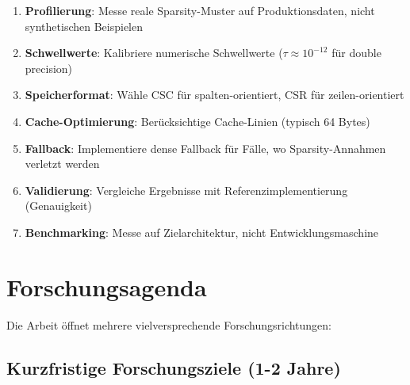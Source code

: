 \documentclass[a4paper,12pt]{report}
\theoremstyle{definition}
\begin{document}
	\begin{enumerate}
		\item \textbf{Profilierung}: Messe reale Sparsity-Muster auf Produktionsdaten, nicht synthetischen Beispielen
		\item \textbf{Schwellwerte}: Kalibriere numerische Schwellwerte ($\tau \approx 10^{-12}$ für double precision)
		\item \textbf{Speicherformat}: Wähle CSC für spalten-orientiert, CSR für zeilen-orientiert
		\item \textbf{Cache-Optimierung}: Berücksichtige Cache-Linien (typisch 64 Bytes)
		\item \textbf{Fallback}: Implementiere dense Fallback für Fälle, wo Sparsity-Annahmen verletzt werden
		\item \textbf{Validierung}: Vergleiche Ergebnisse mit Referenzimplementierung (Genauigkeit)
		\item \textbf{Benchmarking}: Messe auf Zielarchitektur, nicht Entwicklungsmaschine
	\end{enumerate}
	
	\section{Forschungsagenda}
	
	Die Arbeit öffnet mehrere vielversprechende Forschungsrichtungen:
	
	\subsection{Kurzfristige Forschungsziele (1-2 Jahre)}
	
\end{document}

